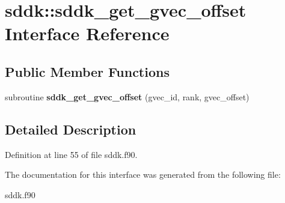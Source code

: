 \hypertarget{interfacesddk_1_1sddk__get__gvec__offset}{}\section{sddk\+:\+:sddk\+\_\+get\+\_\+gvec\+\_\+offset Interface Reference}
\label{interfacesddk_1_1sddk__get__gvec__offset}
\subsection*{Public Member Functions}
\begin{DoxyCompactItemize}
\item 
\hypertarget{interfacesddk_1_1sddk__get__gvec__offset_aaa264bec58e8576a92e4742a5acaf814}{}subroutine {\bfseries sddk\+\_\+get\+\_\+gvec\+\_\+offset} (gvec\+\_\+id, rank, gvec\+\_\+offset)\label{interfacesddk_1_1sddk__get__gvec__offset_aaa264bec58e8576a92e4742a5acaf814}

\end{DoxyCompactItemize}


\subsection{Detailed Description}


Definition at line 55 of file sddk.\+f90.



The documentation for this interface was generated from the following file\+:\begin{DoxyCompactItemize}
\item 
sddk.\+f90\end{DoxyCompactItemize}
